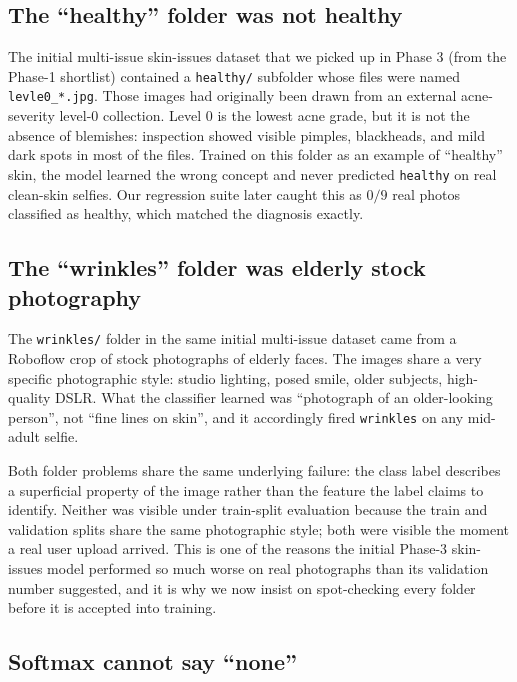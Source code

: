 \documentclass[11pt,a4paper,oneside]{report}
\begin{document}
\subsection{The ``healthy'' folder was not healthy}

The initial multi-issue skin-issues dataset that we picked up in
Phase 3 (from the Phase-1 shortlist) contained a \texttt{healthy/}
subfolder whose files were named \texttt{levle0\_*.jpg}. Those
images had originally been drawn from an external acne-severity
level-0 collection. Level 0 is the lowest acne grade, but it is
not the absence of blemishes: inspection showed visible pimples,
blackheads, and mild dark spots in most of the files. Trained on
this folder as an example of ``healthy'' skin, the model learned
the wrong concept and never predicted \texttt{healthy} on real
clean-skin selfies. Our regression suite later caught this
as \(0/9\) real photos classified as healthy, which matched the
diagnosis exactly.

\subsection{The ``wrinkles'' folder was elderly stock photography}

The \texttt{wrinkles/} folder in the same initial multi-issue
dataset came from a Roboflow crop of stock photographs of elderly
faces. The images share a very specific photographic style: studio
lighting, posed smile, older subjects, high-quality DSLR. What the
classifier learned was ``photograph of an older-looking person'',
not ``fine lines on skin'', and it accordingly fired
\texttt{wrinkles} on any mid-adult selfie.

Both folder problems share the same underlying failure: the class
label describes a superficial property of the image rather than
the feature the label claims to identify. Neither was visible
under train-split evaluation because the train and validation
splits share the same photographic style; both were visible the
moment a real user upload arrived. This is one of the reasons the
initial Phase-3 skin-issues model performed so much worse on real
photographs than its validation number suggested, and it is why
we now insist on spot-checking every folder before it is accepted
into training.

\subsection{Softmax cannot say ``none''}
\end{document}
